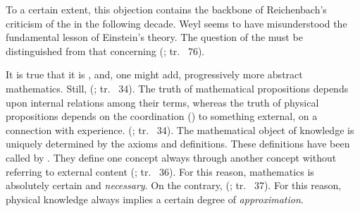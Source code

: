 \documentclass[final]{article}
\newcommand{\rhp}[2]{(\cite[#1]{Reichenbach1920a}; tr.\ \citeyear{Reichenbach1969} #2)\xspace}
\begin{document}
%
To a certain extent, this objection contains the backbone of Reichenbach's criticism of the \uftp in the following decade. Weyl seems to have misunderstood the fundamental lesson of Einstein's theory. The question of the  must be distinguished from that concerning  \rhp{73}{76}.

It is true that it is , and, one might add, progressively more abstract mathematics. Still,  \rhp{33}{34}. The truth of mathematical propositions depends upon internal relations among their terms, whereas the truth of physical propositions depends on the coordination () to something external, on a connection with experience.  \rhp{33}{34}. The mathematical object of knowledge is uniquely determined by the axioms and definitions. These definitions have been called  by \citet{Schlick1918}. They define one concept always through another concept without referring to external content \rhp{33}{36}. For this reason, mathematics is absolutely certain and \emph{necessary}. On the contrary,  \rhp{34}{37}. For this reason, physical knowledge always implies a certain degree of \emph{approximation}.
\end{document}
